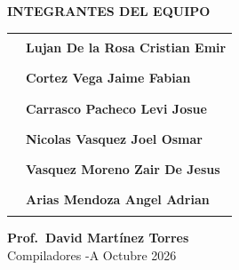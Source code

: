 {\vspace{0.9cm}
\begin{center}
  {\color{colA}\small\bfseries\MakeUppercase{Integrantes del equipo}}\\[0.55cm]
  \renewcommand{\arraystretch}{1.55}
  \begin{tabular}{cl}
    \textcolor{colB}{\rule{4pt}{4pt}} &
      \textbf{Lujan De la Rosa Cristian Emir} \\
    \textcolor{colB}{\rule{4pt}{4pt}} &
      \textbf{Cortez Vega Jaime Fabian} \\
    \textcolor{colB}{\rule{4pt}{4pt}} &
      \textbf{Carrasco Pacheco Levi Josue} \\
    \textcolor{colB}{\rule{4pt}{4pt}} &
      \textbf{Nicolas Vasquez Joel Osmar} \\
    \textcolor{colB}{\rule{4pt}{4pt}} &
      \textbf{Vasquez Moreno Zair De Jesus} \\
    \textcolor{colB}{\rule{4pt}{4pt}} &
      \textbf{Arias Mendoza Angel Adrian} \\
  \end{tabular}
\end{center}

\vfill

\noindent\colorbox{colA}{\parbox{\textwidth}{\centering
  \vspace{0.55cm}
  {\color{white}\bfseries Prof.\ David Martínez Torres}\\[0.18cm]
  {\color{colC} Compiladores \quad\textbullet{}-A \quad\textbullet\quad Octubre 2026}
  \vspace{0.55cm}
}}%
}%
\restoregeometry
